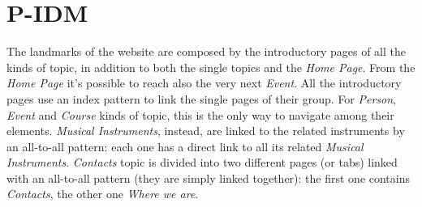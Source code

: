 \documentclass[../../DD.tex]{subfiles}
\begin{document}
\section{P-IDM}
	The landmarks of the website are composed by the introductory pages of all the kinds of topic, in addition to both the single topics and the \textit{Home Page}. From the \textit{Home Page} it's possible to reach also the very next \textit{Event}.
	\newline
	All the introductory pages use an index pattern to link the single pages of their group. For \textit{Person}, \textit{Event} and \textit{Course} kinds of topic, this is the only way to navigate among their elements. \textit{Musical Instruments}, instead, are linked to the related instruments by an all-to-all pattern: each one has a direct link to all its related \textit{Musical Instruments}.
	\newline
	\textit{Contacts} topic is divided into two different pages (or tabs) linked with an all-to-all pattern (they are simply linked together): the first one contains \textit{Contacts}, the other one \textit{Where we are}.
\end{document}
